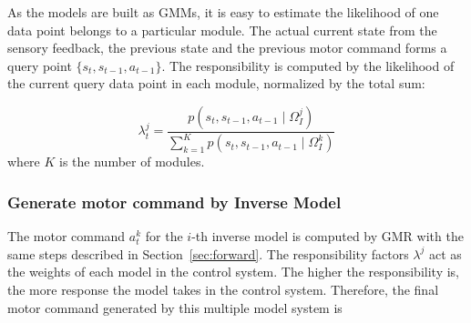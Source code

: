 \documentclass[preprint,12pt]{elsarticle}
\begin{document}
As the models are built as GMMs, it is easy to estimate the likelihood of one data point belongs to a particular module. The actual current state from the sensory feedback, the previous state and the previous motor command forms a query point $\{s_t,s_{t-1},a_{t-1}\}$. The responsibility is computed by the likelihood of the current query data point in each module, normalized by the total sum:

\begin{equation}
\lambda^j_t = \frac{p(s_t,s_{t-1},a_{t-1}\mid \Omega_I^j)}{\sum_{k=1}^{K}{p(s_t,s_{t-1},a_{t-1}\mid \Omega_I^k)}}
\end{equation}
where $K$ is the number of modules.


\subsubsection{Generate motor command by Inverse Model}
\label{sec:inverse}

The motor command $a^k_t$ for the $i$-th inverse model is computed by GMR with the same steps  described in Section~\ref{sec:forward}. The responsibility factors $\lambda^j$ act as the weights of each model in the control system. The higher the responsibility is, the more response the model takes in the control system. Therefore, the final motor command generated by this multiple model system is
\end{document}
